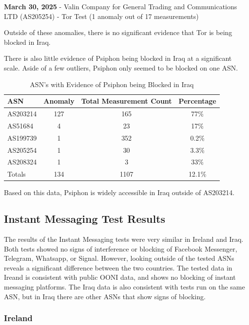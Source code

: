 \textbf{March 30, 2025} - Valin Company for General Trading and Communications LTD (AS205254) - Tor Test (1 anomaly out of 17 measurements)

Outside of these anomalies, there is no significant evidence that Tor is being blocked in Iraq.

There is also little evidence of Psiphon being blocked in Iraq at a significant scale. Aside of a few outliers, Psiphon only seemed to be blocked on one ASN. 

\begin{table}[H]
\centering
\caption{ASN's with Evidence of Psiphon being Blocked in Iraq}
\begin{tabular}{lccc}
\toprule
\textbf{ASN} & \textbf{Anomaly} & \textbf{Total Measurement Count} & \textbf{Percentage} \\
\midrule
AS203214  & 127 & 165  & 77\% \\
AS51684   & 4   & 23   & 17\% \\
AS199739  & 1   & 352  & 0.2\% \\
AS205254  & 1   & 30   & 3.3\% \\
AS208324  & 1   & 3    & 33\% \\
\bottomrule
Totals    & 134 & 1107 & 12.1\% \\
\end{tabular}
\label{tab:category_block}
\end{table}

Based on this data, Psiphon is widely accessible in Iraq outside of AS203214.

\subsection{Instant Messaging Test Results}

The results of the Instant Messaging tests were very similar in Ireland and Iraq. Both tests showed no signs of interference or blocking of Facebook Messenger, Telegram, Whatsapp, or Signal. However, looking outside of the tested ASNs reveals a significant difference between the two countries. The tested data in Ireand is consistent with public OONI data, and shows no blocking of instant messaging platforms. The Iraq data is also consistent with tests run on the same ASN, but in Iraq there are other ASNs that show signs of blocking.

\subsubsection{Ireland}


